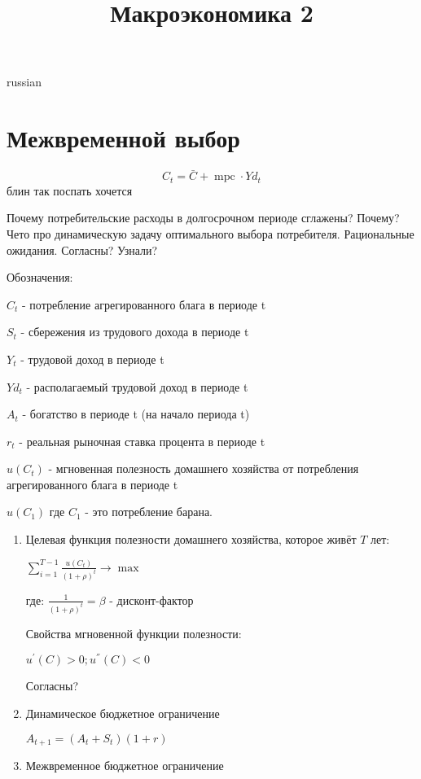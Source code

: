 \documentclass{article}
\begin{document}
\title{\foreignlanguage{russian}{Макроэкономика 2}}
\maketitle
\begin{otherlanguage*}{russian}
\section{\foreignlanguage{russian}{Межвременной выбор}}
\begin{equation}
C_t = \bar{C} + \operatorname{mpc} \cdot Yd_t
\end{equation}
блин так поспать хочется

Почему потребительские расходы в долгосрочном периоде сглажены? Почему? 
Чето про динамическую задачу оптимального выбора потребителя. Рациональные ожидания. Согласны? Узнали?

Обозначения:

$C_t$ - потребление агрегированного блага в периоде t

$S_t$ - сбережения из трудового дохода в периоде t

$Y_t$ - трудовой доход в периоде t

$Yd_t$ - располагаемый трудовой доход в периоде t

$A_t$ - богатство в периоде t (на начало периода t) 

$r_t$ - реальная рыночная ставка процента в периоде t

$u(C_t)$ - мгновенная полезность домашнего хозяйства от потребления агрегированного блага в периоде t

$u(C_1)$ где $C_1$ - это потребление барана.
\begin{enumerate}
\item Целевая функция полезности домашнего хозяйства, которое живёт $T$ лет:

$ \sum_{i=1}^{T-1} \frac{u(C_t)}{(1 + \rho)^t} \rightarrow \max $

где: $\frac{1}{(1+\rho)^t} = \beta$  - дисконт-фактор

Свойства мгновенной функции полезности:

$u^{'}(C) > 0; u^{''}(C) < 0$

Согласны?
\item Динамическое бюджетное ограничение

$A_{t+1} = (A_t + S_t) (1 + r) $

\item Межвременное бюджетное ограничение


\end{enumerate}
\end{otherlanguage*}
\end{document}
